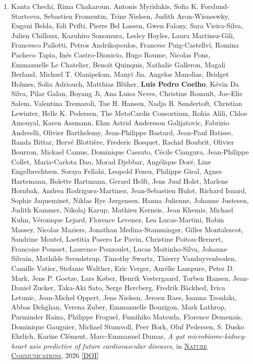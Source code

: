 \documentclass{article}
\newcommand\showdoi[1]{%
    \href{https://doi.org/#1}{[DOI]}%
}
\newcommand\pubname[1]{\textsc{\uline{#1}}}
\begin{document}
\begin{enumerate}[resume]
\item Kanta Chechi, Rima Chakaroun, Antonis Myridakis, Sofia K. Forslund-Startceva, Sebastien Fromentin, Trine Nielsen, Judith Aron-Wisneswky, Eugeni Belda, Edi Prifti, Pierre Bel Lassen, Gwen Falony, Sara Vieira-Silva, Julien Chilloux, Kazuhiro Sonomura, Lesley Hoyles, Laura Martinez-Gili, Francesco Pallotti, Petros Andrikopoulos, Francesc Puig-Castellví, Romina Pacheco Tapia, Inés Castro-Dionicio, Hugo Roume, Nicolas Pons, Emmanuelle Le Chatelier, Benoit Quinquis, Nathalie Galleron, Magali Berland, Michael T. Olanipekun, Manyi Jia, Angelos Manolias, Bridget Holmes, Solia Adriouch, Matthias Blüher, \textbf{Luis Pedro Coelho}, Kévin Da Silva, Pilar Galan, Boyang Ji, Ana Luisa Neves, Christine Rouault, Joe-Elie Salem, Valentina Tremaroli, Tue H. Hansen, Nadja B. Søndertoft, Christian Lewinter, Helle K. Pedersen, The MetaCardis Consortium, Rohia Alili, Chloe Amouyal, Karen Assmann, Ehm Astrid Andersson Galijatovic, Fabrizio Andreelli, Olivier Barthelemy, Jean-Philippe Bastard, Jean-Paul Batisse, Randa Bittar, Hervé Blottière, Frederic Bosquet, Rachid Boubrit, Olivier Bourron, Mickael Camus, Dominique Cassuto, Cécile Ciangura, Jean-Philippe Collet, Maria-Carlota Dao, Morad Djebbar, Angélique Doré, Line Engelbrechtsen, Soraya Fellahi, Leopold Fezeu, Philippe Giral, Agnes Hartemann, Bolette Hartmann, Gerard Helft, Jens Juul Holst, Marlene Hornbak, Andrea Rodriguez-Martinez, Jean-Sebastien Hulot, Richard Isnard, Sophie Jaqueminet, Niklas Rye Jørgensen, Hanna Julienne, Johanne Justesen, Judith Kammer, Nikolaj Karup, Mathieu Kerneis, Jean Khemis, Michael Kuhn, Véronique Lejard, Florence Levenez, Lea Lucas-Martini, Robin Massey, Nicolas Maziers, Jonathan Medina-Stamminger, Gilles Montalescot, Sandrine Moutel, Laetitia Pasero Le Pavin, Christine Poitou-Bernert, Francoise Pousset, Laurence Pouzoulet, Lucas Moitinho-Silva, Johanne Silvain, Mathilde Svendstrup, Timothy Swartz, Thierry Vanduyvenboden, Camille Vatier, Stefanie Walther, Eric Verger, Aurélie Lampure, Peter D. Mark, Jens P. Goetze, Lars Køber, Henrik Vestergaard, Torben Hansen, Jean-Daniel Zucker, Taka-Aki Sato, Serge Hercberg, Fredrik Bäckhed, Ivica Letunic, Jean-Michel Oppert, Jens Nielsen, Jeroen Raes, Ioanna Tzoulaki, Abbas Dehghan, Verena Zuber, Emmanuelle Bouzigon, Mark Lathrop, Parminder Raina, Philippe Froguel, Fumihiko Matsuda, Florence Demenais, Dominique Gauguier, Michael Stumvoll, Peer Bork, Oluf Pedersen, S. Dusko Ehrlich, Karine Clément, Marc-Emmanuel Dumas, \emph{A gut microbiome-kidney-heart axis predictive of future cardiovascular diseases}, in \pubname{Nature Communications}, 2026 \showdoi{10.1038/s41467-026-69405-0}


\end{enumerate}
\end{document}
